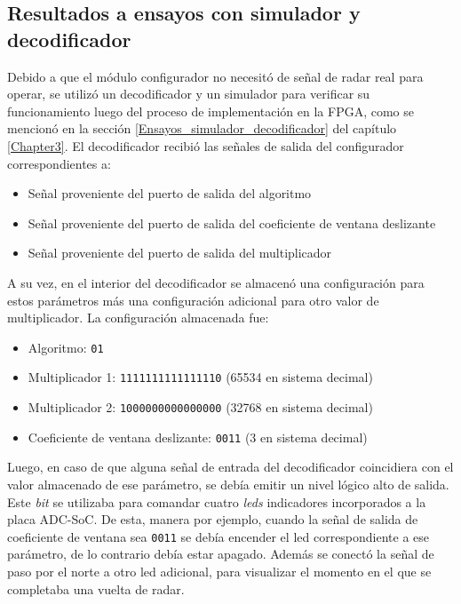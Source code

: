 \subsection{Resultados a ensayos con simulador y decodificador}
\label{Subsec: Resultados de simulador y decodificador}

Debido a que el módulo configurador no necesitó de señal de radar real para operar, se utilizó un decodificador y un simulador para verificar su funcionamiento luego del proceso de implementación en la FPGA, como se mencionó en la sección \ref{Ensayos_simulador_decodificador} del capítulo \ref{Chapter3}. El decodificador recibió las señales de salida del configurador correspondientes a:

\begin{itemize}
\item Señal proveniente del puerto de salida del algoritmo
\item Señal proveniente del puerto de salida del coeficiente de ventana deslizante
\item Señal proveniente del puerto de salida del multiplicador
\end{itemize}

A su vez, en el interior del decodificador se almacenó una configuración para estos parámetros más una configuración adicional para otro valor de multiplicador. La configuración almacenada fue:

\begin{itemize}
\item Algoritmo: \texttt{01}
\item Multiplicador 1: \texttt{1111111111111110} (65534 en sistema decimal)
\item Multiplicador 2: \texttt{1000000000000000} (32768 en sistema decimal)
\item Coeficiente de ventana deslizante: \texttt{0011} (3 en sistema decimal)
\end{itemize}


Luego, en caso de que alguna señal de entrada del decodificador coincidiera con el valor almacenado de ese parámetro, se debía emitir un nivel lógico alto de salida. Este \textit{bit} se utilizaba para comandar cuatro \textit{leds} indicadores incorporados a la placa ADC-SoC. De esta, manera por ejemplo, cuando la señal de salida de coeficiente de ventana sea \texttt{0011} se debía encender el led correspondiente a ese parámetro, de lo contrario debía estar apagado. Además se conectó la señal de paso por el norte a otro led adicional, para visualizar el momento en el que se completaba una vuelta de radar.

